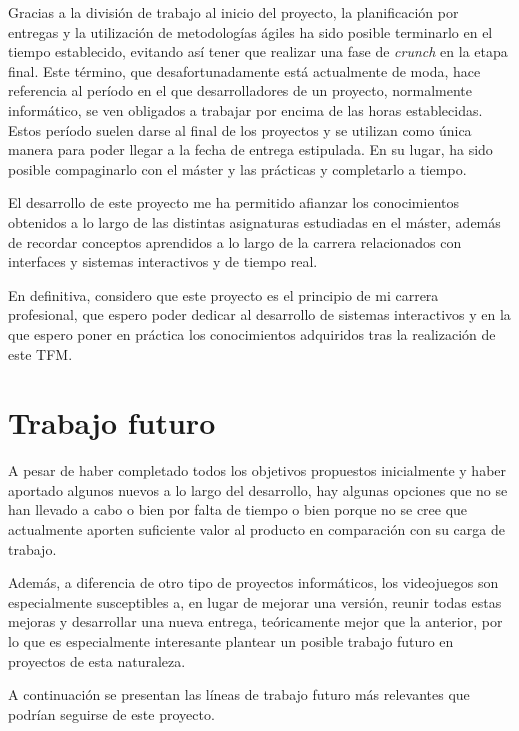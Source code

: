 Gracias a la división de trabajo al inicio del proyecto, la planificación por entregas y la utilización de metodologías ágiles ha sido posible terminarlo en el tiempo establecido, evitando así tener que realizar una fase de \textit{crunch} en la etapa final. Este término, que desafortunadamente está actualmente de moda, hace referencia al período en el que desarrolladores de un proyecto, normalmente informático, se ven obligados a trabajar por encima de las horas establecidas. Estos período suelen darse al final de los proyectos y se utilizan como única manera para poder llegar a la fecha de entrega estipulada. En su lugar, ha sido posible compaginarlo con el máster y las prácticas y completarlo a tiempo.

El desarrollo de este proyecto me ha permitido afianzar los conocimientos obtenidos a lo largo de las distintas asignaturas estudiadas en el máster, además de recordar conceptos aprendidos a lo largo de la carrera relacionados con interfaces y sistemas interactivos y de tiempo real.

En definitiva, considero que este proyecto es el principio de mi carrera profesional, que espero poder dedicar al desarrollo de sistemas interactivos y en la que espero poner en práctica los conocimientos adquiridos tras la realización de este \acs{TFM}.


\section{Trabajo futuro}

A pesar de haber completado todos los objetivos propuestos inicialmente y haber aportado algunos nuevos a lo largo del desarrollo, hay algunas opciones que no se han llevado a cabo o bien por falta de tiempo o bien porque no se cree que actualmente aporten suficiente valor al producto en comparación con su carga de trabajo.

Además, a diferencia de otro tipo de proyectos informáticos, los videojuegos son especialmente susceptibles a, en lugar de mejorar una versión, reunir todas estas mejoras y desarrollar una nueva entrega, teóricamente mejor que la anterior, por lo que es especialmente interesante plantear un posible trabajo futuro en proyectos de esta naturaleza. 

A continuación se presentan las líneas de trabajo futuro más relevantes que podrían seguirse de este proyecto.

